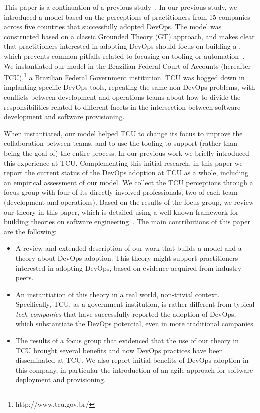 This paper is a continuation of a previous study~\cite{Luz:2018:ESEM}.
In our previous study, we introduced a model based on the perceptions of practitioners from
15 companies across five countries that successfully adopted DevOps. The model
was constructed based on a classic Grounded Theory (GT) approach,
and makes clear that practitioners interested in adopting DevOps should focus on building a
\cc, which prevents common pitfalls related to focusing on tooling or automation~\cite{Kromhout:2017:Queue}.
We instantiated our model in the Brazilian Federal Court of
Accounts (hereafter TCU),\footnote{http://www.tcu.gov.br/} a Brazilian Federal Government institution. TCU was
bogged down in implanting specific DevOps tools, repeating the same non-DevOps
problems, with conflicts between development and operations teams about how to
divide the responsibilities related to different facets in the intersection
between software development and software provisioning.

When instantiated,
our model helped TCU to change its focus to improve the collaboration between teams, and to use the tooling
to support (rather than being the goal of) the entire process.
In our previous work
we briefly introduced this experience at TCU.
Complementing this initial research, in this paper we report the current status
of the DevOps adoption at TCU as a whole, including an empirical assessment of our model.
We collect the TCU perceptions through a focus group with four of its directly
involved professionals, two of each team (development and operations). Based on
the results of the focus group, we review our theory in this paper, which is
detailed using a well-known framework for building theories on software engineering~\cite{sjoberg2008}.
The main contributions of this paper are the following:

\begin{itemize}
\item A review and extended description of our work that builds a model and
  a theory about DevOps adoption. This theory might support practitioners interested in adopting DevOps,
  based on evidence acquired from industry peers.

\item An instantiation of this theory in a real world, non-trivial context. Specifically, TCU,
  as a government institution, is rather different from typical \emph{tech companies} that have
  successfully reported the adoption of DevOps, which substantiate the DevOps potential, even in more traditional
  companies.

\item The results of a focus group that evidenced that the use of our theory in TCU brought several
  benefits and now DevOps practices have been disseminated at TCU. We also report initial benefits
  of DevOps adoption in this company, in particular the introduction of an agile approach for software
  deployment and provisioning.

\end{itemize}

